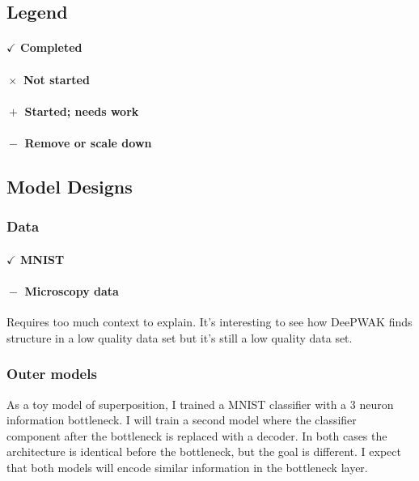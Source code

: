 \subsection{Legend}
\paragraph{$\boxed{\checkmark}$ Completed}
\paragraph{$\boxed{\times}$ Not started}
\paragraph{$\boxed{+}$ Started; needs work}
\paragraph{$\boxed{-}$ Remove or scale down}

\subsection{Model Designs}

\subsubsection{Data}
\paragraph{$\boxed{\checkmark}$ MNIST}
\paragraph{$\boxed{-}$ Microscopy data}
Requires too much context to explain.
It's interesting to see how DeePWAK finds structure in a low quality data set but it's still a low quality data set.

\subsubsection{Outer models}
As a toy model of superposition, I trained a MNIST classifier with a 3 neuron information bottleneck.
I will train a second model where the classifier component after the bottleneck is replaced with a decoder.
In both cases the architecture is identical before the bottleneck, but the goal is different.
I expect that both models will encode similar information in the bottleneck layer.


